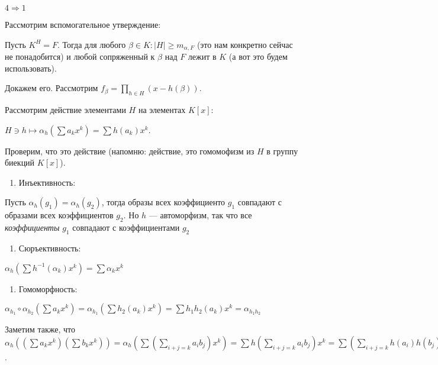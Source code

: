 \begin{solution}
\(4 \Rightarrow 1\)

\hypertarget{9.1.useful.statement}{Рассмотрим вспомогательное утверждение:}

Пусть \(K^H = F\). Тогда для любого \(\beta \in K: |H| \geqslant m_{\alpha, F}\) (это нам конкретно сейчас не понадобится) и любой сопряженный к \(\beta\) над \(F\) лежит в \(K\) (а вот это будем использовать).

Докажем его. Рассмотрим \(f_\beta = {\displaystyle \prod_{h \in H}(x - h(\beta))}\).

Рассмотрим действие элементами \(H\) на элементах \(K[x]:\)

\(H \ni h \mapsto \alpha_h(\sum a_k x^k) = \sum h(a_k) x^k\).

Проверим, что это действие (напомню: действие, это гомомофизм из \(H\) в группу биекций \(K[x]\)).

\begin{enumerate}
\def\labelenumi{\arabic{enumi})}
\tightlist
\item
  Инъективность:
\end{enumerate}

Пусть \(\alpha_h(g_1) = \alpha_h(g_2)\), тогда образы всех коэффициенто \(g_1\) совпадают с образами всех коэффициентов \(g_2\). Но \(h\) --- автоморфизм, так что все \textit{коэффициенты} \(g_1\) совпадают с коэффициентами \(g_2\)

\begin{enumerate}
\def\labelenumi{\arabic{enumi})}
\setcounter{enumi}{1}
\tightlist
\item
  Сюръективность:
\end{enumerate}

\(\alpha_h(\sum h^{-1}(\alpha_k) x^k) = \sum \alpha_kx^k\)

\begin{enumerate}
\def\labelenumi{\arabic{enumi})}
\setcounter{enumi}{2}
\tightlist
\item
  Гомоморфность:
\end{enumerate}

\(\alpha_{h_1} \circ \alpha_{h_2}(\sum a_k x^k) = \alpha_{h_1}(\sum h_2(a_k) x^k) = \sum h_1 h_2 (a_k) x^k = \alpha_{h_1 h_2}\)

Заметим также, что \(\alpha_h((\sum a_k x^k)(\sum b_kx^k)) = \alpha_h(\sum (\sum\limits_{i + j = k} a_ib_j)x^k) = \sum h(\sum\limits_{i + j = k} a_ib_j)x^k = \sum (\sum\limits_{i + j = k} h(a_i)h(b_j)) x^k = (\sum h(a_k)x^k)(\sum h(b_k)x^k) = \alpha_h(\sum a_kx^k)\alpha_h(\sum b_kx^k)\).


\end{solution}
